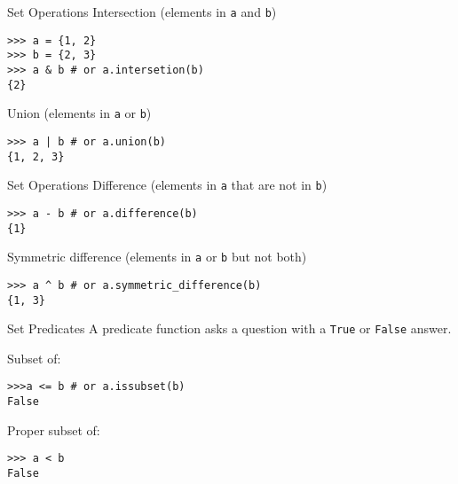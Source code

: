 \documentclass[smaller]{beamer}
\begin{document}
\begin{frame}[label={sec:org73150f7},fragile]{Set Operations}
 Intersection (elements in \texttt{a} \alert{and} \texttt{b})

\lstset{language=Python,label= ,caption= ,captionpos=b,numbers=none}
\begin{lstlisting}
>>> a = {1, 2}
>>> b = {2, 3}
>>> a & b # or a.intersetion(b)
{2}
\end{lstlisting}

Union (elements in \texttt{a} \alert{or} \texttt{b})

\lstset{language=Python,label= ,caption= ,captionpos=b,numbers=none}
\begin{lstlisting}
>>> a | b # or a.union(b)
{1, 2, 3}
\end{lstlisting}
\end{frame}

\begin{frame}[label={sec:orgcef9116},fragile]{Set Operations}
 Difference (elements in \texttt{a} that are not in \texttt{b})

\lstset{language=Python,label= ,caption= ,captionpos=b,numbers=none}
\begin{lstlisting}
>>> a - b # or a.difference(b)
{1}
\end{lstlisting}

Symmetric difference (elements in \texttt{a} or \texttt{b} but not both)

\lstset{language=Python,label= ,caption= ,captionpos=b,numbers=none}
\begin{lstlisting}
>>> a ^ b # or a.symmetric_difference(b)
{1, 3}
\end{lstlisting}
\end{frame}

\begin{frame}[label={sec:org38a872b},fragile]{Set Predicates}
 A predicate function asks a question with a \texttt{True} or \texttt{False} answer.

Subset of:

\lstset{language=Python,label= ,caption= ,captionpos=b,numbers=none}
\begin{lstlisting}
>>>a <= b # or a.issubset(b)
False
\end{lstlisting}

Proper subset of:

\lstset{language=Python,label= ,caption= ,captionpos=b,numbers=none}
\begin{lstlisting}
>>> a < b
False
\end{lstlisting}
\end{frame}
\end{document}
